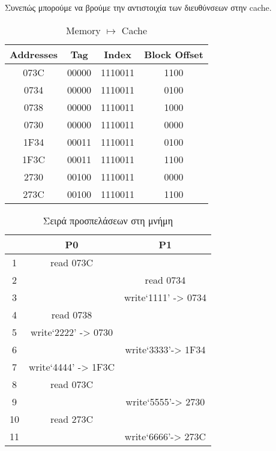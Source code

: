 \documentclass[a4paper,12pt]{article}
\begin{document}
Συνεπώς μπορούμε να βρούμε την αντιστοιχία των διευθύνσεων στην cache.

\begin{table}[H]
    \centering
    \begin{tabular}{c | c c c}
        Addresses & Tag & Index & Block Offset \\
        \hline
        073C & 00000 & 1110011 & 1100 \\
        0734 & 00000 & 1110011 & 0100 \\
        0738 & 00000 & 1110011 & 1000 \\
        0730 & 00000 & 1110011 & 0000 \\
        1F34 & 00011 & 1110011 & 0100 \\
        1F3C & 00011 & 1110011 & 1100 \\
        2730 & 00100 & 1110011 & 0000 \\
        273C & 00100 & 1110011 & 1100 \\
    \end{tabular}
    \caption{Memory $\mapsto$ Cache}
    \label{fig:T6}
\end{table}


\begin{table}[H]
    \centering
    \begin{tabular}{| c | c c |}
            \hline
 & P0 & P1                    \\
            \hline
        1 & read 073C &                       \\
            \hline
        2 & & read 0734             \\
            \hline
        3 & & write‘1111’ -> 0734   \\
            \hline
        4 & read 0738 &                       \\
            \hline
        5 & write‘2222’ -> 0730 &                       \\
            \hline
        6 & & write‘3333’-> 1F34    \\
            \hline
        7 & write‘4444’ -> 1F3C &                       \\
            \hline
        8 & read 073C &                       \\
            \hline
        9 & & write‘5555’-> 2730    \\
            \hline
        10 & read 273C &                       \\
            \hline
        11 & & write‘6666’-> 273C    \\
            \hline
    \end{tabular}
    \caption{Σειρά προσπελάσεων στη μνήμη}
    \label{fig:T7}
\end{table}
\end{document}
